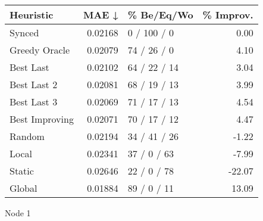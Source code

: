 \begin{tabular}{lrlr}
\toprule
\textbf{Heuristic} & \textbf{MAE ↓} & \textbf{\% Be/Eq/Wo} & \textbf{\% Improv.} \\
\midrule
            Synced &        0.02168 &          0 / 100 / 0 &                0.00 \\
     Greedy Oracle &        0.02079 &          74 / 26 / 0 &                4.10 \\
         Best Last &        0.02102 &         64 / 22 / 14 &                3.04 \\
       Best Last 2 &        0.02081 &         68 / 19 / 13 &                3.99 \\
       Best Last 3 &        0.02069 &         71 / 17 / 13 &                4.54 \\
    Best Improving &        0.02071 &         70 / 17 / 12 &                4.47 \\
            Random &        0.02194 &         34 / 41 / 26 &               -1.22 \\
             Local &        0.02341 &          37 / 0 / 63 &               -7.99 \\
            Static &        0.02646 &          22 / 0 / 78 &              -22.07 \\
            Global &        0.01884 &          89 / 0 / 11 &               13.09 \\
\bottomrule
\end{tabular}
\caption{Node 1}
\label{tab:iid_lr05_le2_bs4_1}
